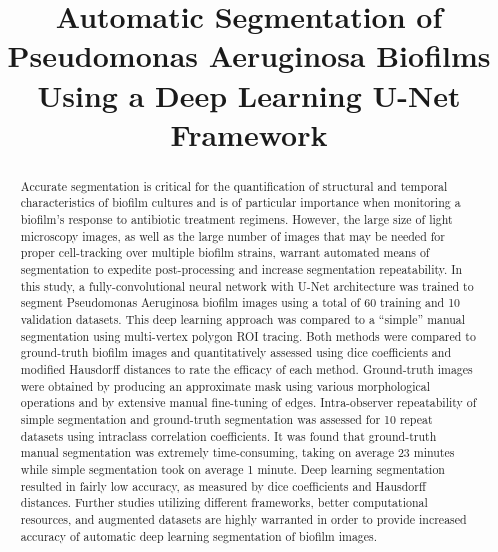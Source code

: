 \documentclass[conference]{IEEEtran}
\begin{document}
\title{Automatic Segmentation of Pseudomonas Aeruginosa Biofilms Using a Deep Learning U-Net Framework}
\author{
}
\maketitle

\begin{abstract}
Accurate segmentation is critical for the quantification of structural and temporal characteristics of biofilm cultures and is of particular importance when monitoring a biofilm’s response to antibiotic treatment regimens. However, the large size of light microscopy images, as well as the large number of images that may be needed for proper cell-tracking over multiple biofilm strains, warrant automated means of segmentation to expedite post-processing and increase segmentation repeatability. In this study, a fully-convolutional neural network with U-Net architecture was trained to segment Pseudomonas Aeruginosa biofilm images using a total of 60 training and 10 validation datasets. This deep learning approach was compared to a “simple” manual segmentation using multi-vertex polygon ROI tracing. Both methods were compared to ground-truth biofilm images and quantitatively assessed using dice coefficients and modified Hausdorff distances to rate the efficacy of each method. Ground-truth images were obtained by producing an approximate mask using various morphological operations and by extensive manual fine-tuning of edges. Intra-observer repeatability of simple segmentation and ground-truth segmentation was assessed for 10 repeat datasets using intraclass correlation coefficients. It was found that ground-truth manual segmentation was extremely time-consuming, taking on average 23 minutes while simple segmentation took on average 1 minute. Deep learning segmentation resulted in fairly low accuracy, as measured by dice coefficients and Hausdorff distances. Further studies utilizing different frameworks, better computational resources, and augmented datasets are highly warranted in order to provide increased accuracy of automatic deep learning segmentation of biofilm images.
\end{abstract}



\end{document}
